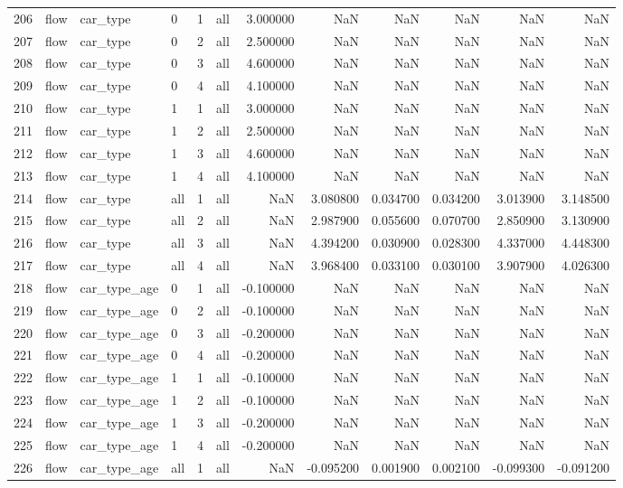 \begin{tabular}{llllllrrrrrr}
206 & flow & car_type & 0 & 1 & all & 3.000000 & NaN & NaN & NaN & NaN & NaN \\
207 & flow & car_type & 0 & 2 & all & 2.500000 & NaN & NaN & NaN & NaN & NaN \\
208 & flow & car_type & 0 & 3 & all & 4.600000 & NaN & NaN & NaN & NaN & NaN \\
209 & flow & car_type & 0 & 4 & all & 4.100000 & NaN & NaN & NaN & NaN & NaN \\
210 & flow & car_type & 1 & 1 & all & 3.000000 & NaN & NaN & NaN & NaN & NaN \\
211 & flow & car_type & 1 & 2 & all & 2.500000 & NaN & NaN & NaN & NaN & NaN \\
212 & flow & car_type & 1 & 3 & all & 4.600000 & NaN & NaN & NaN & NaN & NaN \\
213 & flow & car_type & 1 & 4 & all & 4.100000 & NaN & NaN & NaN & NaN & NaN \\
214 & flow & car_type & all & 1 & all & NaN & 3.080800 & 0.034700 & 0.034200 & 3.013900 & 3.148500 \\
215 & flow & car_type & all & 2 & all & NaN & 2.987900 & 0.055600 & 0.070700 & 2.850900 & 3.130900 \\
216 & flow & car_type & all & 3 & all & NaN & 4.394200 & 0.030900 & 0.028300 & 4.337000 & 4.448300 \\
217 & flow & car_type & all & 4 & all & NaN & 3.968400 & 0.033100 & 0.030100 & 3.907900 & 4.026300 \\
218 & flow & car_type_age & 0 & 1 & all & -0.100000 & NaN & NaN & NaN & NaN & NaN \\
219 & flow & car_type_age & 0 & 2 & all & -0.100000 & NaN & NaN & NaN & NaN & NaN \\
220 & flow & car_type_age & 0 & 3 & all & -0.200000 & NaN & NaN & NaN & NaN & NaN \\
221 & flow & car_type_age & 0 & 4 & all & -0.200000 & NaN & NaN & NaN & NaN & NaN \\
222 & flow & car_type_age & 1 & 1 & all & -0.100000 & NaN & NaN & NaN & NaN & NaN \\
223 & flow & car_type_age & 1 & 2 & all & -0.100000 & NaN & NaN & NaN & NaN & NaN \\
224 & flow & car_type_age & 1 & 3 & all & -0.200000 & NaN & NaN & NaN & NaN & NaN \\
225 & flow & car_type_age & 1 & 4 & all & -0.200000 & NaN & NaN & NaN & NaN & NaN \\
226 & flow & car_type_age & all & 1 & all & NaN & -0.095200 & 0.001900 & 0.002100 & -0.099300 & -0.091200 \\

\end{tabular}
